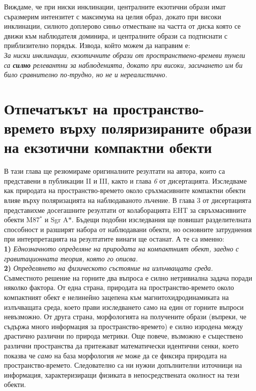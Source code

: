 \documentclass[12pt]{article}
\numberwithin{equation}{section}
\numberwithin{figure}{section}
\begin{document}
Виждаме, че при ниски инклинации, централните екзотични образи имат съразмерим интензитет с максимума на целия образ, докато при високи инклинации, силното доплерово синьо отместване на частта от диска която се движи към наблюдателя доминира, и централните образи са подтиснати с приблизително порядък. Извода, който можем да направим е:\\
	
\emph{За ниски инклинации, екзотичните образи от пространствено-времеви тунели са \textbf{силно} релевантни за наблюденията, докато при високи, засичането им би било сравнително по-трудно, но не и нереалистично.}
	
	\newpage
	
	\section{Отпечатъкът на пространство-времето върху поляризираните образи на екзотични компактни обекти}
	
	В тази глава ще резюмираме оригиналните резултати на автора, които са представени в публикации II и III, както и глава \emph{6} от дисертацията. Изследваме как природата на пространство-времето около сръхмасивните компактни обекти влияе върху поляризацията на наблюдаваното лъчение. В глава {3} от дисертацията представихме досегашните резултати от колаборацията EHT за свръхмасивните обекти M87$^*$ и Sgr A$*$. Бъдещи подобни изследвания ще повишат разделителната способност и разширят набора от наблюдавани обекти, но основните затруднения при интерпретацията на резултатите винаги ще останат. А те са именно:\\
	
	\textbf{1)} \emph{Еднозначното определяне на природата на компактният обект, заедно с гравитационната теория, която го описва.}\\
	
	\textbf{2)} \emph{Определянето на физическото състояние на излъчващата среда.}\\
	
	Съвместното решение на горните два въпроса е силно нетривиална задача поради няколко фактора. От една страна, природата на пространство-времето около компактният обект е нелинейно зацепена към магнитохидродинамиката на излъчващата среда, което прави изследването само на един от горните въпроси невъзможно. От друга страна, морфологията на получените образи (въпреки, че съдържа много информация за пространство-времето) е силно изродена между драстично различни по природа метрики. Още повече, възможно е съществено различни пространства да притежават математически идентични сенки\cite{PhysRevD.103.084040}, което показва че \emph{само} на база морфология \emph{не} може да се фиксира природата на пространство-времето. Следователно са ни нужни допълнителни източници на информация, характеризиращи физиката в непосредствената околност на тези обекти. \\
	
\end{document}
